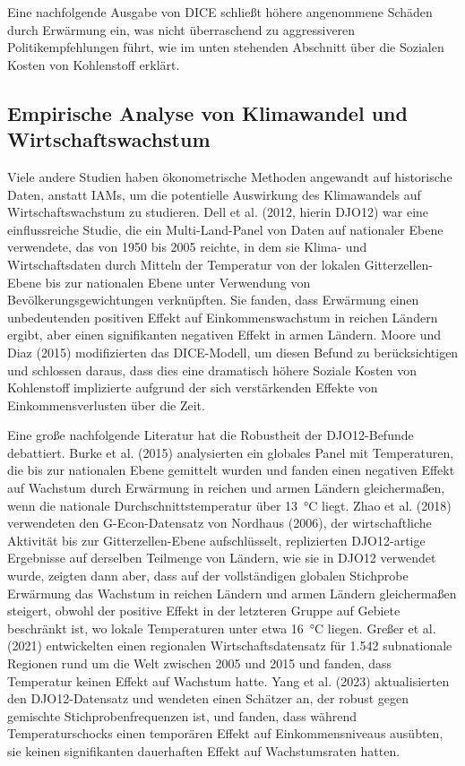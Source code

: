 \documentclass[12pt,paper=a4,DIV=12,parskip=never,chapterprefix=false,headings=standardclasses]{scrreprt}
\begin{document}
Eine nachfolgende Ausgabe von DICE schließt höhere angenommene Schäden durch Erwärmung ein, was nicht überraschend zu aggressiveren Politikempfehlungen führt, wie im unten stehenden Abschnitt über die Sozialen Kosten von Kohlenstoff erklärt.


\subsection{Empirische Analyse von Klimawandel und Wirtschaftswachstum}
Viele andere Studien haben ökonometrische Methoden angewandt auf historische Daten, anstatt IAMs, um die potentielle Auswirkung des Klimawandels auf Wirtschaftswachstum zu studieren. Dell et al. (2012, hierin DJO12) war eine einflussreiche Studie, die ein Multi-Land-Panel von Daten auf nationaler Ebene verwendete, das von 1950 bis 2005 reichte, in dem sie Klima- und Wirtschaftsdaten durch Mitteln der Temperatur von der lokalen Gitterzellen-Ebene bis zur nationalen Ebene unter Verwendung von Bevölkerungsgewichtungen verknüpften. Sie fanden, dass Erwärmung einen unbedeutenden positiven Effekt auf Einkommenswachstum in reichen Ländern ergibt, aber einen signifikanten negativen Effekt in armen Ländern. Moore und Diaz (2015) modifizierten das DICE-Modell, um diesen Befund zu berücksichtigen und schlossen daraus, dass dies eine dramatisch höhere Soziale Kosten von Kohlenstoff implizierte aufgrund der sich verstärkenden Effekte von Einkommensverlusten über die Zeit.

Eine große nachfolgende Literatur hat die Robustheit der DJO12-Befunde debattiert. Burke et al. (2015) analysierten ein globales Panel mit Temperaturen, die bis zur nationalen Ebene gemittelt wurden und fanden einen negativen Effekt auf Wachstum durch Erwärmung in reichen und armen Ländern gleichermaßen, wenn die nationale Durchschnittstemperatur über \SI{13}{\celsius} liegt. Zhao et al. (2018) verwendeten den G-Econ-Datensatz von Nordhaus (2006), der wirtschaftliche Aktivität bis zur Gitterzellen-Ebene aufschlüsselt, replizierten DJO12-artige Ergebnisse auf derselben Teilmenge von Ländern, wie sie in DJO12 verwendet wurde, zeigten dann aber, dass auf der vollständigen globalen Stichprobe Erwärmung das Wachstum in reichen Ländern und armen Ländern gleichermaßen steigert, obwohl der positive Effekt in der letzteren Gruppe auf Gebiete beschränkt ist, wo lokale Temperaturen unter etwa \SI{16}{\celsius} liegen.
Greßer et al. (2021) entwickelten einen regionalen Wirtschaftsdatensatz für 1.542 subnationale Regionen rund um die Welt zwischen 2005 und 2015 und fanden, dass Temperatur keinen Effekt auf Wachstum hatte. Yang et al. (2023) aktualisierten den DJO12-Datensatz und wendeten einen Schätzer an, der robust gegen gemischte Stichprobenfrequenzen ist, und fanden, dass während Temperaturschocks einen temporären Effekt auf Einkommensniveaus ausübten, sie keinen signifikanten dauerhaften Effekt auf Wachstumsraten hatten.
\end{document}
